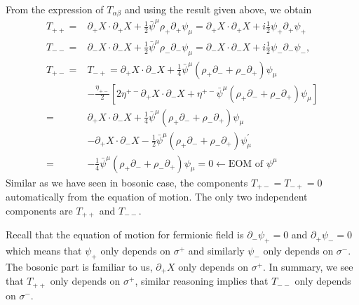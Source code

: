 \documentclass[graybox,envcountchap,sectrefs]{svmono}
\begin{document}
From the expression of $T_{\alpha\beta}$ and using the result given above, we obtain 
\begin{equation}
\begin{aligned}
T_{++}=& \partial_{+} X \cdot \partial_{+} X+\frac{1}{2} \bar{\psi}^{\mu} \rho_{+} \partial_{+} \psi_{\mu}= \partial_{+} X \cdot \partial_{+} X+ i\frac{1}{2}\psi_{+} \partial_{+}\psi_{+}\\
T_{--}=& \partial_{-} X \cdot \partial_{-} X+\frac{1}{2} \bar{\psi}^{\mu} \rho_{-} \partial_{-} \psi_{\mu}= \partial_{-} X \cdot \partial_{-} X+i\frac{1}{2} \psi_{-}\partial_{-}\psi_{-},\\
T_{+-}=& T_{-+}=\partial_{+} X \cdot \partial_{-} X+\frac{1}{4} \bar{\psi}^{\mu}\left(\rho_{+} \partial_{-}+\rho_{-} \partial_{+}\right) \psi_{\mu} \\
&-\frac{\eta_{+-}}{2}\left[2 \eta^{+-} \partial_{+} X \cdot \partial_{-} X+\eta^{+-} \bar{\psi}^{\mu}\left(\rho_{+} \partial_{-}+\rho_{-} \partial_{+}\right) \psi_{\mu}\right] \\
=& \partial_{+} X \cdot \partial_{-} X+\frac{1}{4} \bar{\psi}^{\mu}\left(\rho_{+} \partial_{-}+\rho_{-} \partial_{+}\right) \psi_{\mu} \\
&-\partial_{+} X \cdot \partial_{-} X-\frac{1}{2} \bar{\psi}^{\mu}\left(\rho_{+} \partial_{-}+\rho_{-} \partial_{+}\right) \psi_{\mu}^{\prime} \\
=&-\frac{1}{4} \bar{\psi}^{\mu}\left(\rho_{+} \partial_{-}+\rho_{-} \partial_{+}\right) \psi_{\mu}=0 \leftarrow \mathrm{EOM} \text { of } \psi^{\mu}
\end{aligned}
\end{equation}
Similar as we have seen in bosonic case, the components $T_{+-}=T_{-+}=0$ automatically from the equation of motion. The only two independent components are $T_{++}$ and $T_{--}$.

Recall that the equation of motion for fermionic field is $\partial_{-}\psi_{+}=0$ and $\partial_{+}\psi_{-}=0$ which means that $\psi_{+}$ only depends on $\sigma^+$ and similarly $\psi_{-}$ only depends on $\sigma^-$. The bosonic part is familiar to us, $\partial_{+}X$ only depends on $\sigma^+$. In summary, we see that $T_{++}$ only depends on $\sigma^+$, similar reasoning implies that $T_{--}$ only depends on $\sigma^-$. 
\end{document}
